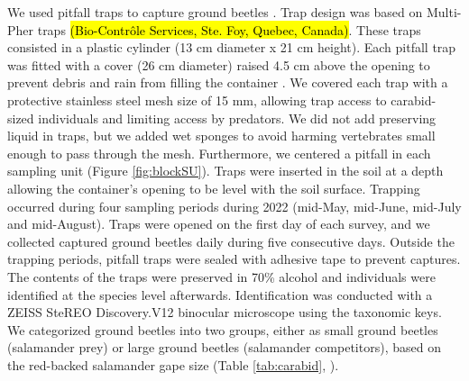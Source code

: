 We used pitfall traps to capture ground beetles \citep{baarsCatchesPitfallTraps1979,spenceSamplingCarabidAssemblages1994a,loveiEcologyBehaviorGround1996,kotzeFortyYearsCarabid2011a,knappEffectPitfallTrap2012}. 
Trap design was based on Multi-Pher traps \hl{(Bio-Contrôle Services, Ste. Foy, Quebec, Canada)}. 
These traps consisted in a plastic cylinder (13 cm diameter x 21 cm height). 
Each pitfall trap was fitted with a cover (26 cm diameter) raised 4.5 cm above the opening to prevent debris and rain from filling the container \citep{Jobin1988MultiPherinsect,Moore2004Effectstwo,bouchardBeetleCommunityResponse2016b}. 
We covered each trap with a protective stainless steel mesh size of 15 mm, allowing trap access to carabid-sized individuals and limiting access by predators.  
We did not add preserving liquid in traps, but we added wet sponges to avoid harming vertebrates small enough to pass through the mesh. 
Furthermore, we centered a pitfall in each sampling unit (Figure \ref{fig:blockSU}). 
Traps were inserted in the soil at a depth allowing the container’s opening to be level with the soil surface. 
Trapping occurred during four sampling periods during 2022 (mid-May, mid-June, mid-July and mid-August). 
Traps were opened on the first day of each survey, and we collected captured ground beetles daily during five consecutive days. 
Outside the trapping periods, pitfall traps were sealed with adhesive tape to prevent captures. 
The contents of the traps were preserved in 70\% alcohol and individuals were identified at the species level afterwards. 
Identification was conducted with a ZEISS SteREO Discovery.V12 binocular microscope using the \cite{larochelleManuelIdentificationCarabidae1976} taxonomic keys. 
We categorized ground beetles into two groups, either as small ground beetles (salamander prey) or large ground beetles (salamander competitors), based on the red-backed salamander gape size (Table \ref{tab:carabid}, \citealp{jaegerFoodLimitedResource1972,magliaModulationPreycaptureBehavior1995,magliaOntogenyFeedingEcology1996}).

